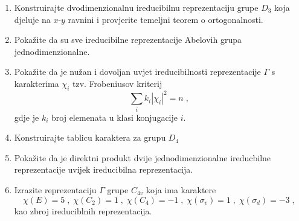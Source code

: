 \begin{enumerate}[label=\arabic{chapter}.\arabic*.]

\item Konstruirajte dvodimenzionalnu ireducibilnu reprezentaciju
    grupe $D_3$ koja djeluje na $x$-$y$ ravnini
i provjerite temeljni teorem o ortogonalnosti.

\item Pokažite da su sve ireducibilne reprezentacije Abelovih grupa jednodimenzionalne.
    \label{zad:1Dabelrep}

\item Pokažite da je nužan i dovoljan uvjet ireducibilnosti reprezentacije
 $\Gamma$ s karakterima $\chi_i$ tzv. Frobeniusov kriterij
\begin{displaymath}
    \sum_i k_i |\chi_i|^2 = n  \;,
\end{displaymath}
gdje je $k_i$ broj elemenata u klasi konjugacije $i$.

\item Konstruirajte tablicu karaktera za grupu $D_4$

\item Pokažite da je direktni produkt dvije jednodimenzionalne
    ireducbilne reprezentacije uvijek ireducibilna reprezentacija.
    \label{zad:1D1D1D}

\item Izrazite reprezentaciju $\Gamma$ grupe $C_{4v}$ koja ima
karaktere
\begin{displaymath}
  \chi(E)=5\;,\; \chi(C_2)=1\;,\; \chi(C_4)=-1\;,\;
  \chi(\sigma_v)=1\;,\; \chi(\sigma_d)=-3\;,
\end{displaymath}
kao zbroj ireduciblnih reprezentacija.
\end{enumerate}
